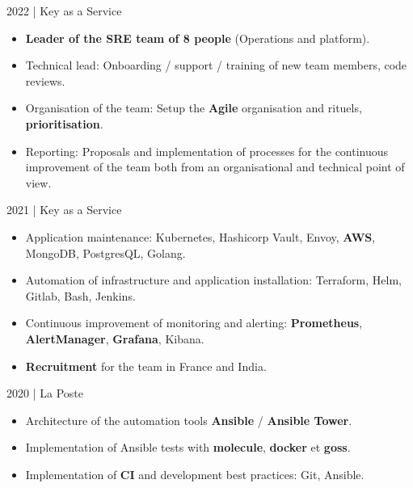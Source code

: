 \documentclass[
	a4paper,
	maincolor=cvartifakt,
	sidecolor=cvgray,
	sidebartextcolor=cvwhite,
	sectioncolor=cvartifakt,
	subsectioncolor=cvgray,
	sidebarwidth=0.36\paperwidth,
    topbottommargin=0.04\paperheight,
]{fortysecondscv}
\makeatletter
\newcommand\thefontsize{\f@size pt}
\makeatother
\begin{document}
\makefrontsidebar{}

\begin{cvtable}[2]
	    {
		\textcolor{maincolor}{2022 | Key as a Service}
	    \begin{itemize}
            \item \textbf{Leader of the SRE team of 8 people} (Operations and platform).
			\item Technical lead: Onboarding / support / training of new team members, code reviews.
			\item Organisation of the team: Setup the \textbf{Agile} organisation and rituels, \textbf{prioritisation}.
			\item Reporting: Proposals and implementation of processes for the continuous improvement of the team both from an organisational and technical point of view.
        \end{itemize}
        \vspace{8pt}
	    \textcolor{maincolor}{2021 | Key as a Service}
	    \begin{itemize}
            \item Application maintenance: Kubernetes, Hashicorp Vault, Envoy, \textbf{AWS}, MongoDB, PostgresQL, Golang.
			\item Automation of infrastructure and application installation: Terraform, Helm, Gitlab, Bash, Jenkins.
			\item Continuous improvement of monitoring and alerting: \textbf{Prometheus}, \textbf{AlertManager}, \textbf{Grafana}, Kibana.
			\item \textbf{Recruitment} for the team in France and India.
        \end{itemize}
		}
	    {
	    \textcolor{maincolor}{2020 | La Poste}
	    \begin{itemize}
            \item Architecture of the automation tools \textbf{Ansible} / \textbf{Ansible Tower}.
            \item Implementation of Ansible tests with \textbf{molecule}, \textbf{docker} et \textbf{goss}.
            \item Implementation of \textbf{CI} and development best practices: Git, Ansible.
        \end{itemize}
}
\end{cvtable}
\end{document}
